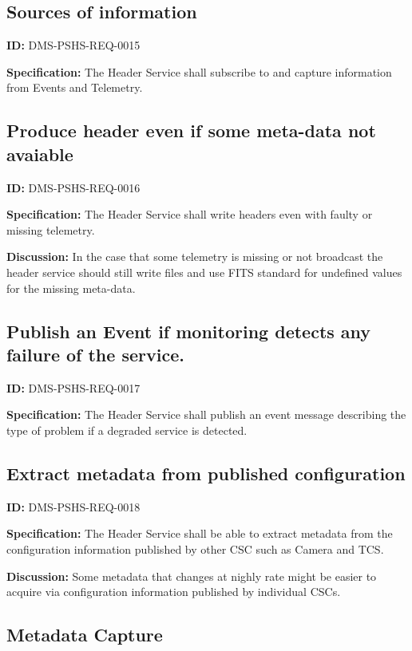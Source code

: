 \documentclass[SE,toc,lsstdraft]{lsstdoc}
\begin{document}
\subsection{Sources of information}

\label{DMS-PSHS-REQ-0015}
\textbf{ID:} DMS-PSHS-REQ-0015

\textbf{Specification:}
The Header Service shall subscribe to and capture information from Events and Telemetry.

\subsection{Produce header even if some meta-data not avaiable}

\label{DMS-PSHS-REQ-0016}
\textbf{ID:} DMS-PSHS-REQ-0016

\textbf{Specification:}
The Header Service shall write headers even with faulty or missing telemetry.

\textbf{Discussion:}
In the case that some telemetry is missing or not broadcast the header service should still write files and use FITS standard for undefined values for the missing meta-data.

\subsection{Publish an Event if monitoring detects any failure of the service.}

\label{DMS-PSHS-REQ-0017}
\textbf{ID:} DMS-PSHS-REQ-0017

\textbf{Specification:}
The Header Service shall publish an event message describing the type of problem if a degraded service is detected.

\subsection{Extract metadata from published configuration}

\label{DMS-PSHS-REQ-0018}
\textbf{ID:} DMS-PSHS-REQ-0018

\textbf{Specification:}
The Header Service shall be able to extract metadata from the configuration information published by other CSC such as Camera and TCS.

\textbf{Discussion:}
Some metadata that changes at nighly rate might be easier to acquire via configuration information published by individual CSCs.

\subsection{Metadata Capture}
\end{document}
